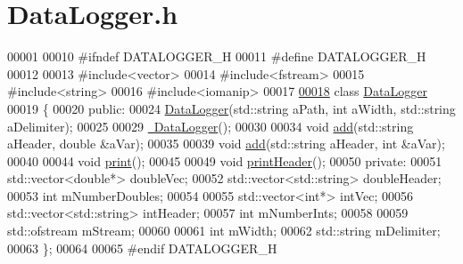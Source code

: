\hypertarget{_data_logger_8h_source}{}\section{Data\+Logger.\+h}
\label{_data_logger_8h_source}

\begin{DoxyCode}
00001 
00010 \textcolor{preprocessor}{#ifndef DATALOGGER\_H}
00011 \textcolor{preprocessor}{#define DATALOGGER\_H}
00012 
00013 \textcolor{preprocessor}{#include<vector>}
00014 \textcolor{preprocessor}{#include<fstream>}
00015 \textcolor{preprocessor}{#include<string>}
00016 \textcolor{preprocessor}{#include<iomanip>}
00017 
\hyperlink{group___tools}{00018} \textcolor{keyword}{class }\hyperlink{group___tools_class_data_logger}{DataLogger}
00019 \{
00020 \textcolor{keyword}{public}:
00024     \hyperlink{group___tools_aa95dc52c00e81fcb074ef4224d305238}{DataLogger}(std::string aPath, \textcolor{keywordtype}{int} aWidth, std::string aDelimiter);
00025 
00029     \hyperlink{group___tools_a9aaff109f3e7749a0a0a0313655da50a}{~DataLogger}();
00030 
00034     \textcolor{keywordtype}{void} \hyperlink{group___tools_a31d8ed8cfdda531f19236e214d5d931f}{add}(std::string aHeader, \textcolor{keywordtype}{double} &aVar);
00035 
00039     \textcolor{keywordtype}{void} \hyperlink{group___tools_a31d8ed8cfdda531f19236e214d5d931f}{add}(std::string aHeader, \textcolor{keywordtype}{int} &aVar);   
00040 
00044     \textcolor{keywordtype}{void} \hyperlink{group___tools_aa1bd66fc07169787398f386d9276708b}{print}();
00045 
00049     \textcolor{keywordtype}{void} \hyperlink{group___tools_ad7247b2350411b48f323de6c91e8479c}{printHeader}();
00050 \textcolor{keyword}{private}:
00051     std::vector<double*> doubleVec;
00052     std::vector<std::string> doubleHeader;
00053     \textcolor{keywordtype}{int} mNumberDoubles;
00054 
00055     std::vector<int*> intVec;
00056     std::vector<std::string> intHeader;
00057     \textcolor{keywordtype}{int} mNumberInts;
00058 
00059     std::ofstream mStream;
00060 
00061     \textcolor{keywordtype}{int} mWidth;
00062     std::string mDelimiter;
00063 \};
00064 
00065 \textcolor{preprocessor}{#endif DATALOGGER\_H}
\end{DoxyCode}
